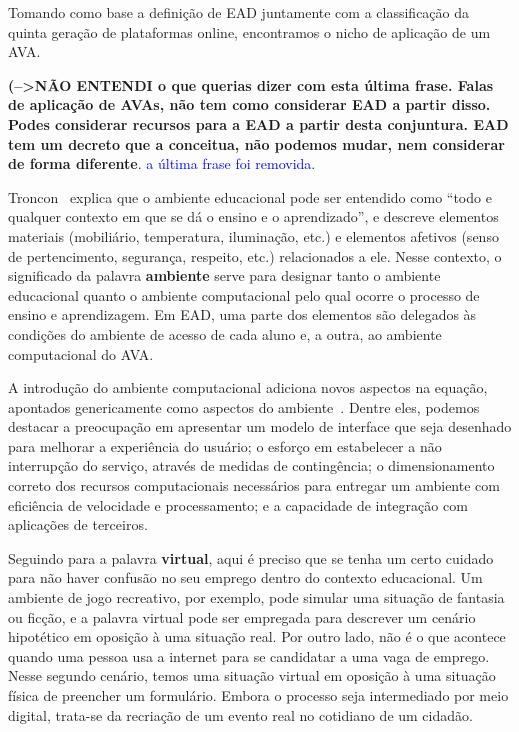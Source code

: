 Tomando como base a definição de EAD juntamente com a classificação da quinta geração de plataformas online, encontramos o nicho de aplicação de um \acrlong{AVA}. %

\textbf{(-->NÃO ENTENDI o que querias dizer com esta última frase. Falas de aplicação de AVAs, não tem como considerar EAD a partir disso. Podes considerar recursos para a EAD a partir desta conjuntura. EAD tem um decreto que a conceitua, não podemos mudar, nem considerar de forma diferente}. \textcolor{blue}{a última frase foi removida.}

Troncon~\cite{RMRP86614} explica que o ambiente educacional pode ser entendido como ``todo e qualquer contexto em que se dá o ensino e o aprendizado'', e descreve elementos materiais (mobiliário, temperatura, iluminação, etc.) e elementos afetivos (senso de pertencimento, segurança, respeito, etc.) relacionados a ele. Nesse contexto, o significado da palavra \textbf{ambiente} serve para designar tanto o ambiente educacional quanto o ambiente computacional pelo qual ocorre o processo de ensino e aprendizagem. Em EAD, uma parte dos elementos são delegados às condições do ambiente de acesso de cada aluno e, a outra, ao ambiente computacional do AVA. %

A introdução do ambiente computacional adiciona novos aspectos na equação, apontados genericamente como aspectos do ambiente~\cite{Ferreira@2016}. Dentre eles, podemos destacar a preocupação em apresentar um modelo de interface que seja desenhado para melhorar a experiência do usuário; o esforço em estabelecer a não interrupção do serviço, através de medidas de contingência; o dimensionamento correto dos recursos computacionais necessários para entregar um ambiente com eficiência de velocidade e processamento; e a capacidade de integração com aplicações de terceiros. 


Seguindo para a palavra \textbf{virtual}, aqui é preciso que se tenha um certo cuidado para não haver confusão no seu emprego dentro do contexto educacional. Um ambiente de jogo recreativo, por exemplo, pode simular uma situação de fantasia ou ficção, e a palavra virtual pode ser empregada para descrever um cenário hipotético em oposição à uma situação real. Por outro lado, não é o que acontece quando uma pessoa usa a internet para se candidatar a uma vaga de emprego. Nesse segundo cenário, temos uma situação virtual em oposição à uma situação física de preencher um formulário. Embora o processo seja intermediado por meio digital, trata-se da recriação de um evento real no cotidiano de um cidadão. 

